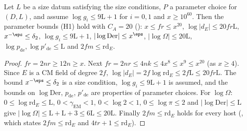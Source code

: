 \begin{proposition}\label{pf:onto1:parA}
Let $L$ be a size datum satisfying the size conditions, $P$ a parameter choice for $(D,L)$, and assume $\log g_i\le9\mathrm
L+1$ for $i=0,1$ and $x\ge10^{60}$. Then the parameter bounds (H1) hold with $C_A=20$
(): $x\le fr\le x^{20}$, $\log|d_E|\le20fr\mathrm L$, $x^{-\eps}\le\delta_2$,
$\log g_i\le9\mathrm L+1$, $|\log\mathrm{Der}|\le x^{\eps}$, $|\log\Omega|\le20\mathrm L$, $\log p_{\mathrm{de}},\log p'_{\mathrm{de}}\le\mathrm
L$ and $2fm\le\mathrm{rd}_E$.
\end{proposition}

\begin{proof}
$fr=2nr\ge12n\ge x$. Next $fr=2nr\le4nk\le4x^8\le x^9\le x^{20}$ (as $x\ge4$). Since $E$ is a CM field of degree $2f$,
$\log|d_E|=2f\log\mathrm{rd}_E\le2f\mathrm L\le20fr\mathrm L$. The bound $x^{-\eps}\le\delta_2$ is a size condition, $\log g_i\le9\mathrm
L+1$ is assumed, and the bounds on $\log\mathrm{Der}$, $p_{\mathrm{de}}$, $p'_{\mathrm{de}}$ are properties of parameter choices. For
$\log\Omega$: $0\le\log\mathrm{rd}_E\le\mathrm L$, $0<\gamma_{\mathrm{EM}}<1$, $0<\log2<1$, $0\le\log\pi\le2$ and $|\log\mathrm{Der}|\le\mathrm L$
give $|\log\Omega|\le\mathrm L+\mathrm L+3\le6\mathrm L\le20\mathrm L$. Finally $2fm\le\mathrm{rd}_E$ holds for every host
(, which states $2fm\le\mathrm{rd}_E$ and $4tr+1\le\mathrm{rd}_E$).
\end{proof}

